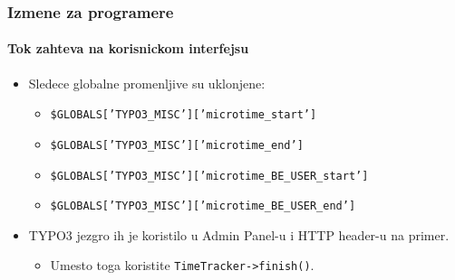 \begin{frame}[fragile]
	\frametitle{Izmene za programere}
	\framesubtitle{Tok zahteva na korisnickom interfejsu}

	\lstset{basicstyle=\smaller\ttfamily}

	\begin{itemize}
		\item Sledece globalne promenljive su uklonjene:

			\begin{itemize}
				\item \texttt{\$GLOBALS['TYPO3\_MISC']['microtime\_start']}
				\item \texttt{\$GLOBALS['TYPO3\_MISC']['microtime\_end']}
				\item \texttt{\$GLOBALS['TYPO3\_MISC']['microtime\_BE\_USER\_start']}
				\item \texttt{\$GLOBALS['TYPO3\_MISC']['microtime\_BE\_USER\_end']}
			\end{itemize}

		\item TYPO3 jezgro ih je koristilo u Admin Panel-u i HTTP header-u na primer.

			\begin{itemize}\smaller
				\item[\ding{228}] Umesto toga koristite \texttt{TimeTracker->finish()}.
			\end{itemize}\normalsize

	\end{itemize}

\end{frame}



